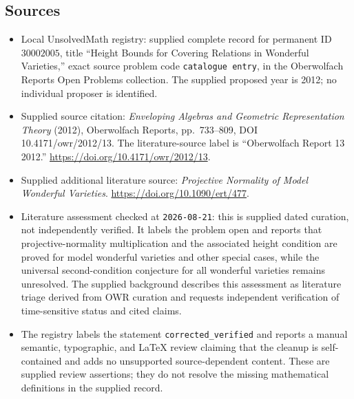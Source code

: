 \documentclass[11pt]{article}
\begin{document}
\subsection{Sources}
\begin{itemize}
\item Local UnsolvedMath registry: supplied complete record for permanent ID \(30002005\), title ``Height Bounds for Covering Relations in Wonderful Varieties,'' exact source problem code \texttt{catalogue entry}, in the Oberwolfach Reports Open Problems collection. The supplied proposed year is 2012; no individual proposer is identified.
\item Supplied source citation: \emph{Enveloping Algebras and Geometric Representation Theory} (2012), Oberwolfach Reports, pp.\ 733--809, DOI 10.4171/owr/2012/13. The literature-source label is ``Oberwolfach Report 13 2012.'' \url{https://doi.org/10.4171/owr/2012/13}.
\item Supplied additional literature source: \emph{Projective Normality of Model Wonderful Varieties}. \url{https://doi.org/10.1090/ert/477}.
\item Literature assessment checked at \texttt{2026-08-21}: this is supplied dated curation, not independently verified. It labels the problem open and reports that projective-normality multiplication and the associated height condition are proved for model wonderful varieties and other special cases, while the universal second-condition conjecture for all wonderful varieties remains unresolved. The supplied background describes this assessment as literature triage derived from OWR curation and requests independent verification of time-sensitive status and cited claims.
\item The registry labels the statement \texttt{corrected\_verified} and reports a manual semantic, typographic, and LaTeX review claiming that the cleanup is self-contained and adds no unsupported source-dependent content. These are supplied review assertions; they do not resolve the missing mathematical definitions in the supplied record.
\end{itemize}
\end{document}
